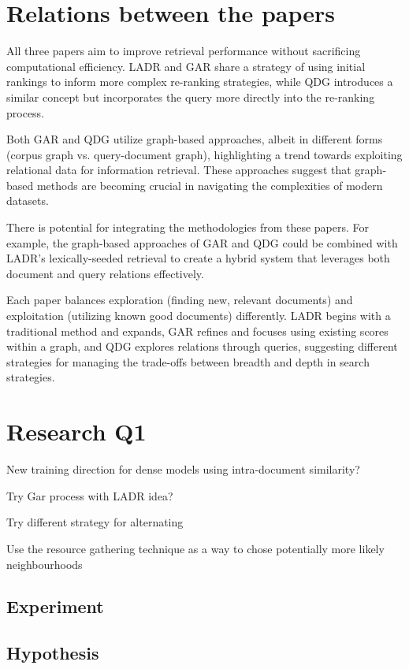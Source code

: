 \documentclass[sigconf,authorversion,nonacm]{acmart}
\begin{document}
\section{Relations between the papers}

All three papers aim to improve retrieval performance without sacrificing computational efficiency.
LADR and GAR share a strategy of using initial rankings to inform more complex re-ranking
strategies, while QDG introduces a similar concept but incorporates the query more directly into the
re-ranking process.

Both GAR and QDG utilize graph-based approaches, albeit in different forms (corpus graph vs.
query-document graph), highlighting a trend towards exploiting relational data for information
retrieval. These approaches suggest that graph-based methods are becoming crucial in navigating the
complexities of modern datasets.

There is potential for integrating the methodologies from these papers. For example, the graph-based
approaches of GAR and QDG could be combined with LADR's lexically-seeded retrieval to create a
hybrid system that leverages both document and query relations effectively.

Each paper balances exploration (finding new, relevant documents) and exploitation (utilizing known
good documents) differently. LADR begins with a traditional method and expands, GAR refines and
focuses using existing scores within a graph, and QDG explores relations through queries, suggesting
different strategies for managing the trade-offs between breadth and depth in search strategies.

\section{Research Q1}

New training direction for dense models using intra-document similarity?

Try Gar process with LADR idea?

Try different strategy for alternating

Use the resource gathering technique as a way to chose potentially more likely neighbourhoods
\subsection{Experiment}

\subsection{Hypothesis}
\end{document}
